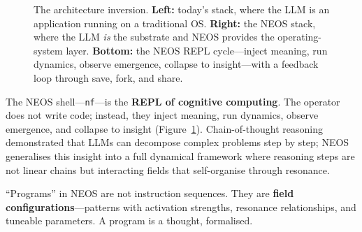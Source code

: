 \begin{figure}[htbp]
\caption{The architecture inversion.  \textbf{Left:} today's stack,
  where the LLM is an application running on a traditional OS.
  \textbf{Right:} the NEOS stack, where the LLM \emph{is} the
  substrate and NEOS provides the operating-system layer.
  \textbf{Bottom:} the NEOS REPL cycle---inject meaning, run dynamics,
  observe emergence, collapse to insight---with a feedback loop through
  save, fork, and share.}
\label{fig:architecture-inversion}
\end{figure}

The NEOS shell---\texttt{nf}---is the \textbf{REPL of cognitive
computing}.  The operator does not write code; instead, they inject
meaning, run dynamics, observe emergence, and collapse to insight
(Figure~\ref{fig:architecture-inversion}).  Chain-of-thought
reasoning~\cite{wei2022chain} demonstrated that LLMs can decompose
complex problems step by step; NEOS generalises this insight into a
full dynamical framework where reasoning steps are not linear chains
but interacting fields that self-organise through resonance.

``Programs'' in NEOS are not instruction sequences.  They are
\textbf{field configurations}---patterns with activation strengths,
resonance relationships, and tuneable parameters.  A program is a
thought, formalised.
